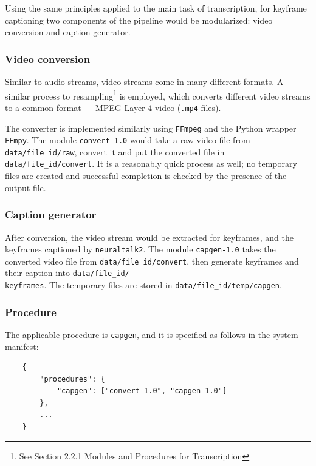 Using the same principles applied to the main task of transcription, for keyframe captioning two components of the pipeline would be modularized: video conversion and caption generator.

\subsubsection{Video conversion}

Similar to audio streams, video streams come in many different formats. A similar process to resampling\footnote{See Section 2.2.1 Modules and Procedures for Transcription} is employed, which converts different video streams to a common format --- MPEG Layer 4 video (\texttt{.mp4} files).

The converter is implemented similarly using \texttt{FFmpeg} and the Python wrapper \texttt{FFmpy}. The module \texttt{convert-1.0} would take a raw video file from \texttt{data/file\_id/raw}, convert it and put the converted file in \texttt{data/file\_id/convert}. It is a reasonably quick process as well; no temporary files are created and successful completion is checked by the presence of the output file.

\subsubsection{Caption generator}

After conversion, the video stream would be extracted for keyframes, and the keyframes captioned by \texttt{neuraltalk2}. The module \texttt{capgen-1.0} takes the converted video file from \texttt{data/file\_id/convert}, then generate keyframes and their caption into \texttt{data/file\_id/\\ keyframes}. The temporary files are stored in \texttt{data/file\_id/temp/capgen}.

\subsubsection{Procedure}

The applicable procedure is \texttt{capgen}, and it is specified as follows in the system manifest:

\begin{lstlisting}
    {
        "procedures": {
            "capgen": ["convert-1.0", "capgen-1.0"]
        },
        ...
    }
\end{lstlisting}